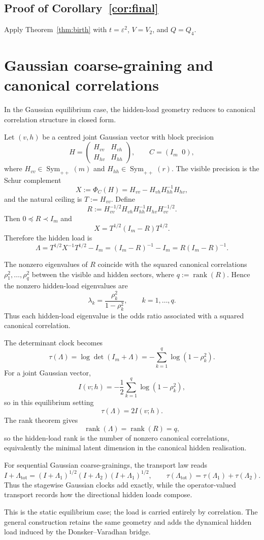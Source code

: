 \documentclass[11pt,a4paper]{article}
\numberwithin{equation}{section}
\DeclareMathOperator{\rank}{rank}
\DeclareMathOperator{\Sym}{Sym}
\theoremstyle{thmcompact}
\theoremstyle{remark}
\begin{document}
\subsection*{Proof of Corollary~\ref{cor:final}}
Apply Theorem~\ref{thm:birth} with $t=\varepsilon^2$, $V=V_2$, and $Q=Q_4$.

\section{Gaussian coarse-graining and canonical correlations}

In the Gaussian equilibrium case, the hidden-load geometry reduces to canonical correlation structure in closed form.

Let $(v,h)$ be a centred joint Gaussian vector with block precision
\[
H=
\begin{pmatrix}
H_{vv} & H_{vh}\\
H_{hv} & H_{hh}
\end{pmatrix},
\qquad
C=(I_m\;\;0),
\]
where $H_{vv}\in\Sym_{++}(m)$ and $H_{hh}\in\Sym_{++}(r)$. The visible precision is the Schur complement
\[
X:=\Phi_C(H)=H_{vv}-H_{vh}H_{hh}^{-1}H_{hv},
\]
and the natural ceiling is $T:=H_{vv}$. Define
\[
R:=H_{vv}^{-1/2}H_{vh}H_{hh}^{-1}H_{hv}H_{vv}^{-1/2}.
\]
Then $0\preceq R\prec I_m$ and
\[
X=T^{1/2}(I_m-R)T^{1/2}.
\]
Therefore the hidden load is
\[
\Lambda
=
T^{1/2}X^{-1}T^{1/2}-I_m
=
(I_m-R)^{-1}-I_m
=
R(I_m-R)^{-1}.
\]

The nonzero eigenvalues of $R$ coincide with the squared canonical correlations $\rho_1^2,\dots,\rho_q^2$ between the visible and hidden sectors, where $q:=\rank(R)$. Hence the nonzero hidden-load eigenvalues are
\[
\lambda_k=\frac{\rho_k^2}{1-\rho_k^2},
\qquad
k=1,\dots,q.
\]
Thus each hidden-load eigenvalue is the odds ratio associated with a squared canonical correlation.

The determinant clock becomes
\[
\tau(\Lambda)=\log\det(I_m+\Lambda)=-\sum_{k=1}^q\log(1-\rho_k^2).
\]
For a joint Gaussian vector,
\[
I(v;h)=-\frac12\sum_{k=1}^q\log(1-\rho_k^2),
\]
so in this equilibrium setting
\[
\tau(\Lambda)=2I(v;h).
\]
The rank theorem gives
\[
\rank(\Lambda)=\rank(R)=q,
\]
so the hidden-load rank is the number of nonzero canonical correlations, equivalently the minimal latent dimension in the canonical hidden realisation.

For sequential Gaussian coarse-grainings, the transport law reads
\[
I+\Lambda_{\mathrm{tot}}
=
(I+\Lambda_1)^{1/2}(I+\Lambda_2)(I+\Lambda_1)^{1/2},
\qquad
\tau(\Lambda_{\mathrm{tot}})=\tau(\Lambda_1)+\tau(\Lambda_2).
\]
Thus the stagewise Gaussian clocks add exactly, while the operator-valued transport records how the directional hidden loads compose.

This is the static equilibrium case; the load is carried entirely by correlation. The general construction retains the same geometry and adds the dynamical hidden load induced by the Donsker--Varadhan bridge.
\end{document}
